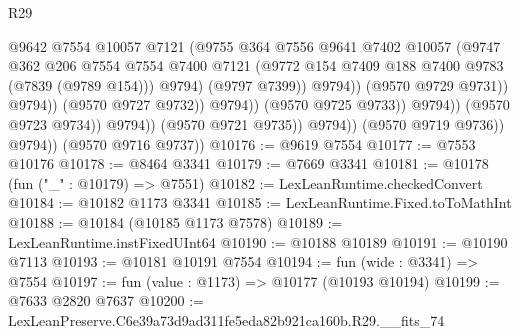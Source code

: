 \begin{lexlean}{R29}
\begin{coremodule}
                                              @9642
                                              @7554
                                              @10057
                                              @7121
                                              (@9755
                                                @364
                                                @7556
                                                @9641
                                                @7402
                                                @10057
                                                (@9747
                                                  @362
                                                  @206
                                                  @7554
                                                  @7554
                                                  @7400
                                                  @7121
                                                  (@9772
                                                    @154
                                                    @7409
                                                    @188
                                                    @7400
                                                    @9783
                                                    (@7839 (@9789 @154)))
                                                  @9794)
                                                (@9797 @7399))
                                              @9794))
                                          (@9570 @9729 @9731))
                                        @9794))
                                    (@9570 @9727 @9732))
                                  @9794))
                              (@9570 @9725 @9733))
                            @9794))
                        (@9570 @9723 @9734))
                      @9794))
                  (@9570 @9721 @9735))
                @9794))
            (@9570 @9719 @9736))
          @9794))
      (@9570 @9716 @9737))
@10176 := @9619 @7554
@10177 := @7553 @10176
@10178 := @8464 @3341
@10179 := @7669 @3341
@10181 := @10178 (fun ("_" : @10179) => @7551)
@10182 := LexLeanRuntime.checkedConvert
@10184 := @10182 @1173 @3341
@10185 := LexLeanRuntime.Fixed.toToMathInt
@10188 := @10184 (@10185 @1173 @7578)
@10189 := LexLeanRuntime.instFixedUInt64
@10190 := @10188 @10189
@10191 := @10190 @7113
@10193 := @10181 @10191 @7554
@10194 := fun (wide : @3341) => @7554
@10197 := fun (value : @1173) => @10177 (@10193 @10194)
@10199 := @7633 @2820 @7637
@10200 := LexLeanPreserve.C6e39a73d9ad311fe5eda82b921ca160b.R29.__fits_74

\end{coremodule}
\end{lexlean}
